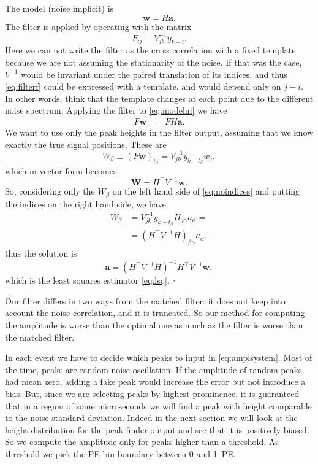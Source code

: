The model (noise implicit) is
%
\begin{equation}
    \mathbf w = H \mathbf a. \label{eq:modelni}
\end{equation}
%
The filter is applied by operating with the matrix
%
\begin{equation}
    F_{ij} \equiv V^{-1}_{jk} y_{k-i}. \label{eq:filterf}
\end{equation}
%
Here we can not write the filter as the cross correlation with a fixed template
because we are not assuming the stationarity of the noise. If that was the
case, $V^{-1}$ would be invariant under the paired translation of its indices,
and thus \eqref{eq:filterf} could be expressed with a template, and would
depend only on $j-i$. In other words, think that the template changes at each
point due to the different noise spectrum. Applying the filter to
\eqref{eq:modelni} we have
%
\begin{align}
    F \mathbf w &= F H \mathbf a. \label{eq:noindices}
\end{align}
%
We want to use only the peak heights in the filter output, assuming that we
know exactly the true signal positions. These are
%
\begin{equation}
    W_\beta \equiv (F \mathbf w)_{t_\beta} = V^{-1}_{jk} y_{k-t_\beta} w_j,
\end{equation}
%
which in vector form becomes
%
\begin{equation}
    \mathbf W = H^\top V^{-1} \mathbf w.
\end{equation}
%
So, considering only the $W_\beta$ on the left hand side of
\eqref{eq:noindices} and putting the indices on the right hand side, we have
%
\begin{align}
    W_\beta &= V^{-1}_{jk} y_{k-t_\beta} H_{j\alpha} a_\alpha = \\
    &= (H^\top V^{-1} H)_{\beta\alpha} a_\alpha,
\end{align}
%
thus the solution is
%
\begin{equation}
    \mathbf a = (H^\top V^{-1} H)^{-1} H^\top V^{-1} \mathbf w,
\end{equation}
%
which is the least squares estimator \eqref{eq:lsq}. \hfill $\square$

Our filter differs in two ways from the matched filter: it does not keep into
account the noise correlation, and it is truncated. So our method for computing
the amplitude is worse than the optimal one as much as the filter is worse than
the matched filter.

In each event we have to decide which peaks to input in \eqref{eq:amplsystem}.
Most of the time, peaks are random noise oscillation. If the amplitude of
random peaks had mean zero, adding a fake peak would increase the error but not
introduce a bias. But, since we are selecting peaks by highest prominence, it
is guaranteed that in a region of some microseconds we will find a peak with
height comparable to the noise standard deviation. Indeed in the next section
we will look at the height distribution for the peak finder output and see that
it is positively biased. So we compute the amplitude only for peaks higher than
a threshold. As threshold we pick the PE bin boundary between 0 and 1~PE.

